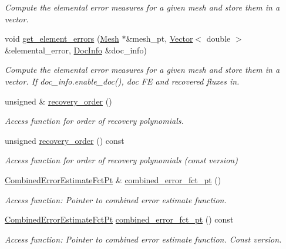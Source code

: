 \begin{DoxyCompactItemize}
\begin{DoxyCompactList}\small\item\em Compute the elemental error measures for a given mesh and store them in a vector. \end{DoxyCompactList}\item 
void \hyperlink{classoomph_1_1Z2ErrorEstimator_ae0fd03123c518ed340bb534c2f6b8cc4}{get\+\_\+element\+\_\+errors} (\hyperlink{classoomph_1_1Mesh}{Mesh} $\ast$\&mesh\+\_\+pt, \hyperlink{classoomph_1_1Vector}{Vector}$<$ double $>$ \&elemental\+\_\+error, \hyperlink{classoomph_1_1DocInfo}{Doc\+Info} \&doc\+\_\+info)
\begin{DoxyCompactList}\small\item\em Compute the elemental error measures for a given mesh and store them in a vector. If doc\+\_\+info.\+enable\+\_\+doc(), doc FE and recovered fluxes in. \end{DoxyCompactList}\item 
unsigned \& \hyperlink{classoomph_1_1Z2ErrorEstimator_af7a3a28cfc05b291b438b80e87c7f5cc}{recovery\+\_\+order} ()
\begin{DoxyCompactList}\small\item\em Access function for order of recovery polynomials. \end{DoxyCompactList}\item 
unsigned \hyperlink{classoomph_1_1Z2ErrorEstimator_ad463b5c01e6bb5b9e4ec9b3a02f9fb4a}{recovery\+\_\+order} () const
\begin{DoxyCompactList}\small\item\em Access function for order of recovery polynomials (const version) \end{DoxyCompactList}\item 
\hyperlink{classoomph_1_1Z2ErrorEstimator_a75ef55e67b21ec49ed1a37d095cfa9f9}{Combined\+Error\+Estimate\+Fct\+Pt} \& \hyperlink{classoomph_1_1Z2ErrorEstimator_a1719ff79e67f2f0b2b8194a91f52d3d2}{combined\+\_\+error\+\_\+fct\+\_\+pt} ()
\begin{DoxyCompactList}\small\item\em Access function\+: Pointer to combined error estimate function. \end{DoxyCompactList}\item 
\hyperlink{classoomph_1_1Z2ErrorEstimator_a75ef55e67b21ec49ed1a37d095cfa9f9}{Combined\+Error\+Estimate\+Fct\+Pt} \hyperlink{classoomph_1_1Z2ErrorEstimator_aa961268bfdb517d9a59a68eb159042c9}{combined\+\_\+error\+\_\+fct\+\_\+pt} () const
\begin{DoxyCompactList}\small\item\em Access function\+: Pointer to combined error estimate function. Const version. \end{DoxyCompactList}\item 

\end{DoxyCompactItemize}
